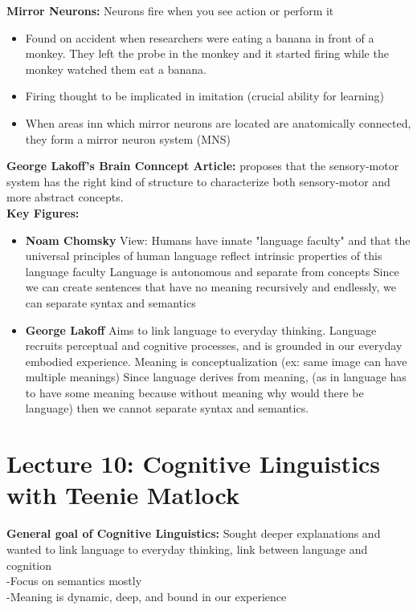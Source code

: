 \documentclass{article}
\begin{document}
\noindent \textbf{Mirror Neurons:} Neurons fire when you see action or perform it
\begin{itemize}
    \item Found on accident when researchers were eating a banana in front of a monkey. They left the probe in the monkey and it started firing while the monkey watched them eat a banana. 
    \item Firing thought to be implicated in imitation (crucial ability for learning) 
    \item When areas inn which mirror neurons are located are anatomically connected, they form a mirror neuron system (MNS)
\end{itemize}

\textbf{George Lakoff's Brain Conncept Article:} proposes that the sensory-motor system has the right kind of structure to characterize both sensory-motor and more abstract concepts. \\

\textbf{Key Figures:}
\begin{itemize}
    \item \textbf{Noam Chomsky}
        \subitem View: Humans have innate "language faculty" and that the universal principles of human language reflect intrinsic properties of this language faculty
        \subitem Language is autonomous and separate from concepts
        \subitem Since we can create sentences that have no meaning recursively and endlessly, we can separate syntax and semantics
    \item \textbf{George Lakoff}
        \subitem Aims to link language to everyday thinking. Language recruits perceptual and cognitive processes, and is grounded in our everyday embodied experience. 
        \subitem Meaning is conceptualization (ex: same image can have multiple meanings)
        \subitem Since language derives from meaning, (as in language has to have some meaning because without meaning why would there be language) then we cannot separate syntax and semantics. 
\end{itemize}

\newpage
\section{Lecture 10: Cognitive Linguistics with Teenie Matlock}

\textbf{General goal of Cognitive Linguistics:} Sought deeper explanations and wanted to link language to everyday thinking, link between language and cognition \\
\indent -Focus on semantics mostly\\
\indent -Meaning is dynamic, deep, and bound in our experience \\
\end{document}
